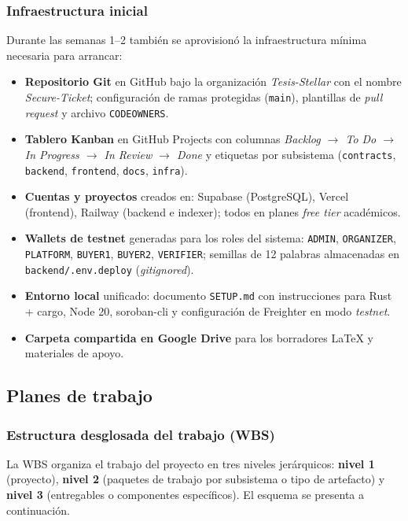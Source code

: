 \documentclass[12pt,oneside]{report}
\begin{document}
      \subsubsection{Infraestructura inicial}
      Durante las semanas 1--2 también se aprovisionó la infraestructura mínima necesaria para arrancar:
      \begin{itemize}
        \item \textbf{Repositorio Git} en GitHub bajo la organización \textit{Tesis-Stellar} con el nombre \textit{Secure-Ticket}; configuración de ramas protegidas (\texttt{main}), plantillas de \textit{pull request} y archivo \texttt{CODEOWNERS}.
        \item \textbf{Tablero Kanban} en GitHub Projects con columnas \textit{Backlog $\rightarrow$ To Do $\rightarrow$ In Progress $\rightarrow$ In Review $\rightarrow$ Done} y etiquetas por subsistema (\texttt{contracts}, \texttt{backend}, \texttt{frontend}, \texttt{docs}, \texttt{infra}).
        \item \textbf{Cuentas y proyectos} creados en: Supabase (PostgreSQL), Vercel (frontend), Railway (backend e indexer); todos en planes \textit{free tier} académicos.
        \item \textbf{Wallets de testnet} generadas para los roles del sistema: \texttt{ADMIN}, \texttt{ORGANIZER}, \texttt{PLATFORM}, \texttt{BUYER1}, \texttt{BUYER2}, \texttt{VERIFIER}; semillas de 12 palabras almacenadas en \texttt{backend/.env.deploy} (\textit{gitignored}).
        \item \textbf{Entorno local} unificado: documento \texttt{SETUP.md} con instrucciones para Rust + cargo, Node 20, soroban-cli y configuración de Freighter en modo \textit{testnet}.
        \item \textbf{Carpeta compartida en Google Drive} para los borradores LaTeX y materiales de apoyo.
      \end{itemize}

    \subsection{Planes de trabajo}
    \label{subsec:planes-trabajo}

      \subsubsection{Estructura desglosada del trabajo (WBS)}
      \label{subsubsec:wbs}
      La WBS organiza el trabajo del proyecto en tres niveles jerárquicos: \textbf{nivel 1} (proyecto), \textbf{nivel 2} (paquetes de trabajo por subsistema o tipo de artefacto) y \textbf{nivel 3} (entregables o componentes específicos). El esquema se presenta a continuación.
\end{document}
